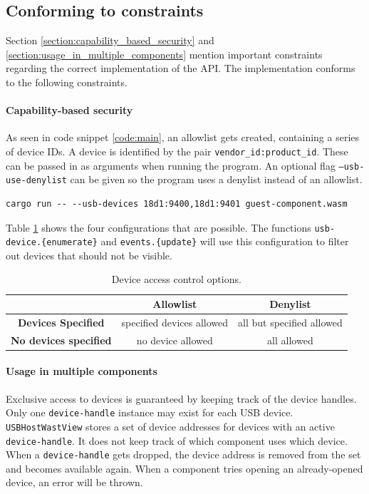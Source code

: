 \subsection{Conforming to constraints}
Section \ref{section:capability_based_security} and \ref{section:usage_in_multiple_components} mention important constraints regarding the correct implementation of the API. The implementation conforms to the following constraints.

\paragraph{Capability-based security}
As seen in code snippet \ref{code:main}, an allowlist gets created, containing a series of device IDs. A device is identified by the pair \texttt{vendor\_id:product\_id}. These can be passed in as arguments when running the program. An optional flag \texttt{--usb-use-denylist} can be given so the program uses a denylist instead of an allowlist.

\begin{verbatim}
cargo run -- --usb-devices 18d1:9400,18d1:9401 guest-component.wasm
\end{verbatim}

Table \ref{table:allowlist} shows the four configurations that are possible. The functions \texttt{usb-device.\{enumerate\}} and \texttt{events.\{update\}} will use this configuration to filter out devices that should not be visible.

\begin{table}[h!]
\centering
\begin{tabular}{|c|c|c|}
\hline
& \textbf{Allowlist} & \textbf{Denylist} \\
\hline
\textbf{Devices Specified} & specified devices allowed & all but specified allowed \\
\hline
\textbf{No devices specified} & no device allowed & all allowed \\
\hline
\end{tabular}
\caption{Device access control options.}
\label{table:allowlist}
\end{table}

\paragraph{Usage in multiple components} Exclusive access to devices is guaranteed by keeping track of the device handles. Only one \texttt{device-handle} instance may exist for each \acrshort{USB} device. \texttt{USBHostWastView} stores a set of device addresses for devices with an active \texttt{device-handle}. It does not keep track of which component uses which device. When a \texttt{device-handle} gets dropped, the device address is removed from the set and becomes available again. When a component tries opening an already-opened device, an error will be thrown. 

